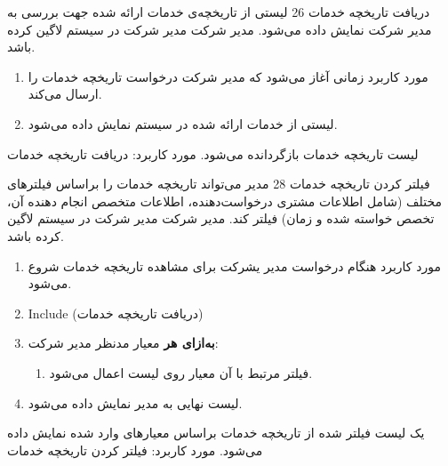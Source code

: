 
{
\usecase
{دریافت تاریخچه خدمات}
{26}
{لیستی از تاریخچه‌ی خدمات ارائه شده جهت بررسی به مدیر شرکت نمایش داده می‌شود.}
{مدیر شرکت}
{}
{مدیر شرکت در سیستم لاگین کرده باشد.}
{
	\vspace*{-0.6cm}
	\begin{enumerate}
		\item مورد کاربرد زمانی آغاز می‌شود که مدیر شرکت درخواست تاریخچه خدمات را ارسال می‌کند.
		\item 
		لیستی از خدمات ارائه شده در سیستم نمایش داده می‌شود.
	\end{enumerate}
}
{لیست تاریخچه خدمات بازگردانده می‌شود.}
{
}
{
	مورد کاربرد: دریافت تاریخچه خدمات
}
}

{
\usecase
{فیلتر کردن تاریخچه خدمات}
{28}
{مدیر می‌تواند تاریخچه خدمات را براساس فیلتر‌های مختلف (شامل اطلاعات مشتری درخواست‌دهنده،‌ اطلاعات متخصص انجام دهنده آن، تخصص خواسته شده و زمان) فیلتر کند. }
{مدیر شرکت}
{}
{مدیر شرکت در سیستم لاگین کرده باشد.}
{
	\vspace*{-0.6cm}
	\begin{enumerate}
		\item مورد کاربرد هنگام درخواست مدیر یشرکت برای مشاهده تاریخچه خدمات شروع می‌شود.
		\item 
		Include (دریافت تاریخچه خدمات)
		\item
		\textbf{به‌ازای هر} معیار مدنظر مدیر شرکت:
		\begin{enumerate}[label=\theenumi.\arabic*.]
			\item فیلتر مرتبط با آن معیار روی لیست اعمال می‌شود.
		\end{enumerate}
		\item لیست نهایی به مدیر نمایش داده می‌شود.
	\end{enumerate}
}
{یک لیست فیلتر شده از تاریخچه خدمات براساس معیارهای وارد شده نمایش داده می‌شود.}
{
}
{
	مورد کاربرد: فیلتر کردن تاریخچه خدمات
}
}

